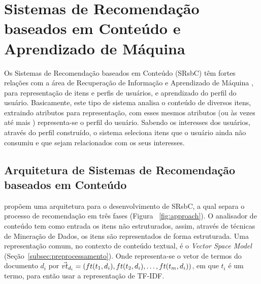 \documentclass[
    12pt,                %
    oneside,            %
    a4paper,            %
    english,            %
    brazil                %
    ]{abntex2ppgsi}
\begin{document}
\chapter{Sistemas de Recomendação baseados em Conteúdo e Aprendizado de Máquina}


Os Sistemas de Recomendação baseados em Conteúdo (SRsbC) têm fortes relações com a área de Recuperação de Informação \cite{Adomavicius2005,Jannach2011} e Aprendizado de Máquina \cite{Adomavicius2005,Lops2011}, para representação de itens e perfis de usuários, e aprendizado do perfil do usuário.
Basicamente, este tipo de sistema analisa o conteúdo de diversos itens, extraindo atributos para representação, com esses mesmos atributos (ou às vezes até mais \cite{Capelle2012}) representa-se o perfil do usuário.
Sabendo os interesses dos usuários, através do perfil construído, o sistema seleciona itens que o usuário ainda não consumiu e que sejam relacionados com os seus interesses.

\section{Arquitetura de Sistemas de Recomendação baseados em Conteúdo}
\label{sec:arquitetura}

 propõem uma arquitetura para o desenvolvimento de SRsbC, a qual separa o processo de recomendação em três fases (Figura ~\ref{fig:approach}). O analisador de conteúdo tem como entrada os itens não estruturados, assim, através de técnicas de Mineração de Dados, os itens são representados de forma estruturada.
Uma representação comum, no contexto de conteúdo textual, é o \textit{Vector Space Model} \cite{Adomavicius2005,Lops2011,Jannach2011} (Seção~\ref{subsec:preprocessamento}).
Onde representa-se o vetor de termos do documento $d_i$ por $\vec{vt}_{d_i} = ( ft(t_1, d_i),\\ ft(t_2, d_i), \dots, ft(t_m, d_i) )$, em que $t_i$ é um termo, para então usar a representação de TF-IDF.
\end{document}
